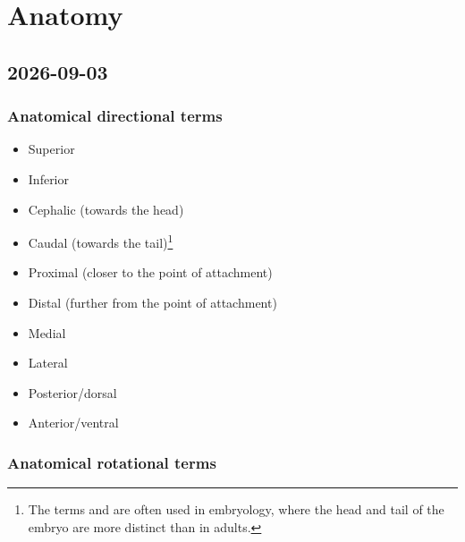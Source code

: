 \chapter{Anatomy}
\label{ch:anatomy}


\section{2026-09-03}

\subsection{Anatomical directional terms}

\begin{itemize}
    \item Superior
    \item Inferior 
    \item Cephalic (towards the head)
    \item Caudal (towards the tail)\footnote{The terms  and  are often used in embryology, where the head and tail of the embryo are more distinct than in adults.}
    \item Proximal (closer to the point of attachment)
    \item Distal (further from the point of attachment)
    \item Medial
    \item Lateral
    \item Posterior/dorsal
    \item Anterior/ventral
\end{itemize}

\subsection{Anatomical rotational terms}

